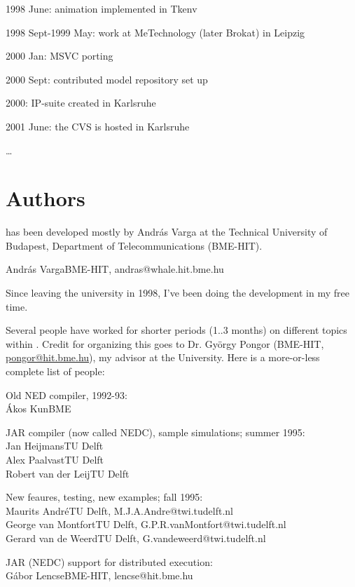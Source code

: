 1998 June: animation implemented in Tkenv

1998 Sept-1999 May: work at MeTechnology (later Brokat) in Leipzig

2000 Jan: MSVC porting

2000 Sept: contributed model repository set up

2000: IP-suite created in Karlsruhe

2001 June: the CVS is hosted in Karlsruhe

\dots





\section{Authors}

{\opp} has been developed mostly by Andr\'{a}s Varga at the Technical
University of Budapest, Department of Telecommunications (BME-HIT).

\tab Andr\'{a}s Varga\tab \tab BME-HIT, andras@whale.hit.bme.hu


Since leaving the university in 1998, I've been doing the development
in my free time.

Several people have worked for shorter periods (1..3 months)
on different topics within {\opp}. Credit for organizing this
goes to Dr. Gy\"{o}rgy Pongor (BME-HIT, \href{mailto:pongor@hit.bme.hu}{pongor@hit.bme.hu}), my
advisor at the University. Here is a more-or-less complete list
of people:

Old NED compiler, 1992-93:\\
\tab \'{A}kos Kun\tab \tab BME

JAR compiler (now called NEDC), sample simulations; summer 1995:\\
\tab Jan Heijmans\tab \tab TU Delft\\
\tab Alex Paalvast\tab \tab TU Delft\\
\tab Robert van der Leij\tab TU Delft

New feaures, testing, new examples; fall 1995:\\
\tab Maurits Andr\'{e}\tab \tab TU Delft, M.J.A.Andre@twi.tudelft.nl\\
\tab George van Montfort\tab TU Delft, G.P.R.vanMontfort@twi.tudelft.nl\\
\tab Gerard van de Weerd\tab TU Delft, G.vandeweerd@twi.tudelft.nl

JAR (NEDC) support for distributed execution:\\
\tab G\'{a}bor Lencse\tab \tab BME-HIT, lencse@hit.bme.hu


